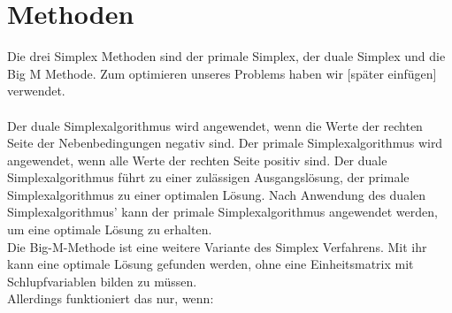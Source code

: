 \section{Methoden}

Die drei Simplex Methoden sind der primale Simplex, der duale Simplex und die Big M Methode. Zum optimieren unseres Problems haben wir [später einfügen] verwendet.\\\\
Der duale Simplexalgorithmus wird angewendet, wenn die Werte der rechten Seite der Nebenbedingungen negativ sind. Der primale Simplexalgorithmus wird angewendet, wenn alle Werte der rechten Seite positiv sind. Der duale Simplexalgorithmus führt zu einer zulässigen Ausgangslösung, der primale Simplexalgorithmus zu einer optimalen Lösung. Nach Anwendung des dualen Simplexalgorithmus' kann der primale Simplexalgorithmus angewendet werden, um eine optimale Lösung zu erhalten. 
\\
Die Big-M-Methode ist eine weitere Variante des Simplex Verfahrens. Mit ihr kann eine optimale Lösung gefunden werden, ohne eine Einheitsmatrix mit Schlupfvariablen bilden zu müssen.
\\
Allerdings funktioniert das nur, wenn:\\
\\


